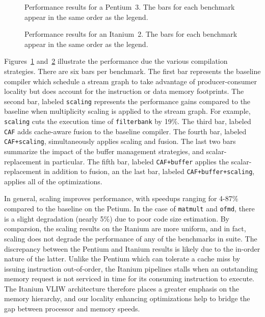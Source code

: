 \begin{figure}[t]
  \vspace{-24pt}
  \hspace{-0.3in}
  \vspace{-48pt}
  \caption{Performance results for a Pentium~3.  The bars for each
  benchmark appear in the same order as the legend.}
  \label{fig:results-p3}
  \vspace{-6pt}
\end{figure}

\begin{figure}[t]
  \vspace{-36pt}
  \hspace{-0.3in}
  \vspace{-48pt}
  \caption{Performance results for an Itanium~2.  The bars for each
  benchmark appear in the same order as the legend.}
  \label{fig:results-ipf}
  \vspace{-12pt}
\end{figure}

Figures~\ref{fig:results-p3} and~\ref{fig:results-ipf} illustrate the
performance due the various compilation strategies. There are six bars
per benchmark. The first bar represents the baseline compiler which
schedule a stream graph to take advantage of producer-consumer
locality but does account for the instruction or data memory
footprints. The second bar, labeled {\tt scaling} represents the
performance gains compared to the baseline when multiplicity scaling
is applied to the stream graph. For example, {\tt scaling} cuts the
execution time of \texttt{filterbank} by 19\%. The third bar, labeled
{\tt CAF} adds cache-aware fusion to the baseline compiler. The fourth
bar, labeled \texttt{CAF+scaling}, simultaneously applies scaling and
fusion. The last two bars summarize the impact of the buffer
management strategies, and scalar-replacement in particular. 
The fifth bar, labeled \texttt{CAF+buffer}
applies the scalar-replacement in addition to fusion, an the last bar,
labeled \texttt{CAF+buffer+scaling}, applies all of the optimizations.

In general, scaling improves performance, with speedups ranging for
4-87\% compared to the baseline on the Petium. In the case of
\texttt{matmult} and \texttt{ofmd}, there is a slight degradation
(nearly 5\%) due to poor code size estimation. By comparsion, the
scaling results on the 
Itanium are more uniform, and in fact, scaling does not degrade the
performance of any of the benchmarks in suite. The discrepancy between
the Pentium and Itanium results is likely due to the in-order
nature of the latter. Unlike the Pentium which can tolerate a cache
miss by issuing instruction out-of-order, the Itanium pipelines stalls
when an outstanding memory request is not serviced in time for
its consuming instruction to execute. The Itanium VLIW architecture
therefore places a greater emphasis on the memory hierarchy, and our
locality enhancing optimizations help to bridge the gap between
processor and memory speeds.

